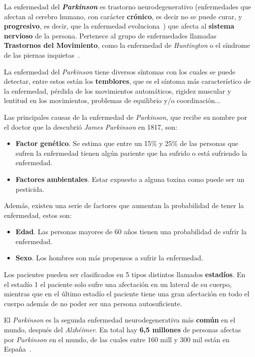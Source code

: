  \label{intro}

La enfermedad del \textit{\textbf{Parkinson}} es trastorno neurodegenerativo (enfermedades que afectan al cerebro humano, con carácter \textbf{crónico}, es decir no se puede curar, y \textbf{progresivo}, es decir, que la enfermedad evoluciona~\cite{jpndresearch2017,cron}) que afecta al \textbf{sistema nervioso} de la persona. Pertenece al grupo de enfermedades llamadas \textbf{Trastornos del Movimiento}, como la enfermedad de \textit{Huntington} o el síndrome de las piernas inquietas~\cite{trasmov,p1,p2,p3}.

La enfermedad del \textit{Parkinson} tiene diversos síntomas con los cuales se puede detectar, entre estos están los \textbf{temblores}, que es el síntoma más característico de la enfermedad, pérdida de los movimientos automáticos, rigidez muscular y lentitud en los movimientos, problemas de equilibrio y/o coordinación$\ldots$

Las principales causas de la enfermedad de \textit{Parkinson}, que recibe su nombre por el doctor que la descubrió \textit{James Parkinson} en 1817, son:
\begin{itemize}
	\item \textbf{Factor genético}. Se estima que entre un 15\% y 25\% de las personas que sufren la enfermedad tienen algún pariente que ha sufrido o está sufriendo la enfermedad.
	\item \textbf{Factores ambientales}. Estar expuesto a alguna toxina como puede ser un pesticida.
\end{itemize}

Además, existen una serie de factores que aumentan la probabilidad de tener la enfermedad, estos son:
\begin{itemize}
	\item \textbf{Edad}. Las personas mayores de 60 años tienen una probabilidad de sufrir la enfermedad.
	\item \textbf{Sexo}. Los hombres son más propensos a sufrir la enfermedad.
\end{itemize}

Los pacientes pueden ser clasificados en 5 tipos distintos llamados \textbf{estadíos}. En el estadío 1 el paciente solo sufre una afectación en un lateral de su cuerpo, mientras que en el último estadío el paciente tiene una gran afectación en todo el cuerpo además de no poder ser una persona autosuficiente.

El \textit{Parkinson} es la segunda enfermedad neurodegenerativa más \textbf{común} en el mundo, después del \textit{Alzhéimer}. En total hay \textbf{6,5 millones} de personas afectas por \textit{Parkinson} en el mundo, de las cuales entre 160 mill y 300 mil están en España~\cite{curemoselparkinson2020}.

